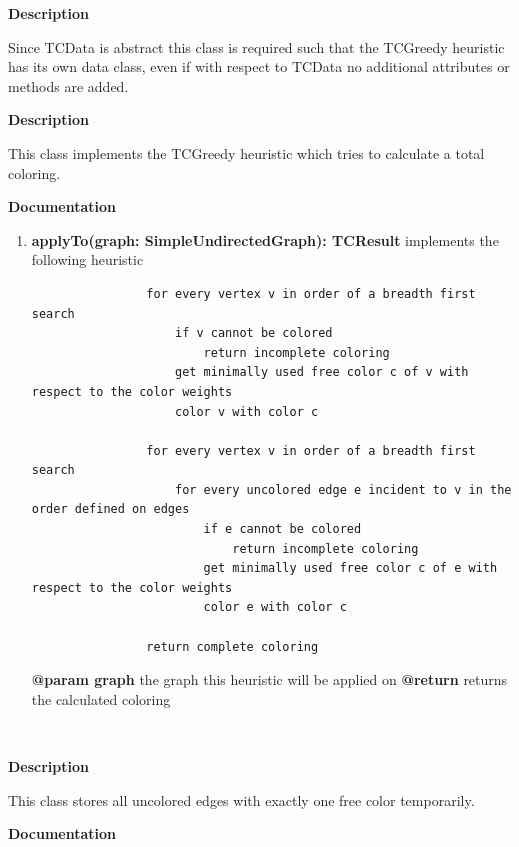 	\textbf{Description}
	
	Since TCData is abstract this class is required such that the TCGreedy heuristic has its own data class, even if with respect to TCData no additional attributes or methods are added.
	
	
	\textbf{Description}
	
	This class implements the TCGreedy heuristic which tries to calculate a total coloring.
	
	\textbf{Documentation}
	\begin{enumerate}[+]
		\item{
			\textbf{applyTo(graph: SimpleUndirectedGraph): TCResult} \newline
			implements the following heuristic
			
			\begin{verbatim}
				for every vertex v in order of a breadth first search
				    if v cannot be colored
				        return incomplete coloring
				    get minimally used free color c of v with respect to the color weights
				    color v with color c
				    
				for every vertex v in order of a breadth first search
				    for every uncolored edge e incident to v in the order defined on edges
				        if e cannot be colored
				            return incomplete coloring
				        get minimally used free color c of e with respect to the color weights
				        color e with color c
				        
				return complete coloring
			\end{verbatim}
			
			\textbf{@param graph} the graph this heuristic will be applied on \newline
			\textbf{@return} returns the calculated coloring
		}
	\end{enumerate}
	
	~\newpage
	
	
	\textbf{Description}
	
	This class stores all uncolored edges with exactly one free color temporarily.
	
	\textbf{Documentation}
	
